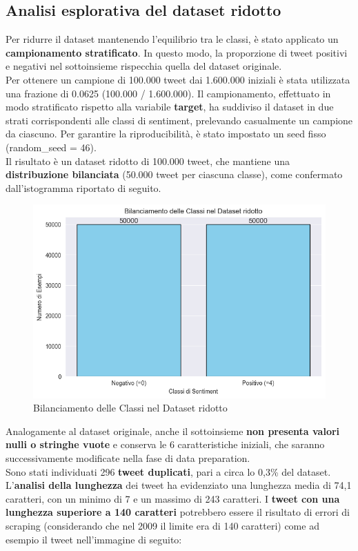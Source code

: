 \documentclass[12pt,a4paper]{report} %
\begin{document}
\subsection{Analisi esplorativa del dataset ridotto}
Per ridurre il dataset mantenendo l’equilibrio tra le classi, è stato applicato un \textbf{campionamento stratificato}. In questo modo, la proporzione di tweet positivi e negativi nel sottoinsieme rispecchia quella del dataset originale.\\Per ottenere un campione di 100.000 tweet dai 1.600.000 iniziali è stata utilizzata una frazione di 0.0625 (100.000 / 1.600.000). Il campionamento, effettuato in modo stratificato rispetto alla variabile \textbf{target}, ha suddiviso il dataset in due strati corrispondenti alle classi di sentiment, prelevando casualmente un campione da ciascuno. Per garantire la riproducibilità, è stato impostato un seed fisso (random\_seed = 46).\\Il risultato è un dataset ridotto di 100.000 tweet, che mantiene una \textbf{distribuzione bilanciata} (50.000 tweet per ciascuna classe), come confermato dall’istogramma riportato di seguito.
\begin{figure}[H]
    \centering
    \includegraphics[width=0.75\linewidth]{immagini/bilanciamento_sentiment140_reduced.png}
    \caption{Bilanciamento delle Classi nel Dataset ridotto}
    \label{fig:enter-label}
\end{figure}
Analogamente al dataset originale, anche il sottoinsieme \textbf{non presenta valori nulli o stringhe vuote} e conserva le 6 caratteristiche iniziali, che saranno successivamente modificate nella fase di data preparation. \\Sono stati individuati 296 \textbf{tweet duplicati}, pari a circa lo 0,3\% del dataset.\\L’\textbf{analisi della lunghezza} dei tweet ha evidenziato una lunghezza media di 74,1 caratteri, con un minimo di 7 e un massimo di 243 caratteri. I \textbf{tweet con una lunghezza superiore a 140 caratteri} potrebbero essere il risultato di errori di scraping (considerando che nel 2009 il limite era di 140 caratteri)  come ad esempio il tweet nell'immagine di seguito: 
\end{document}
